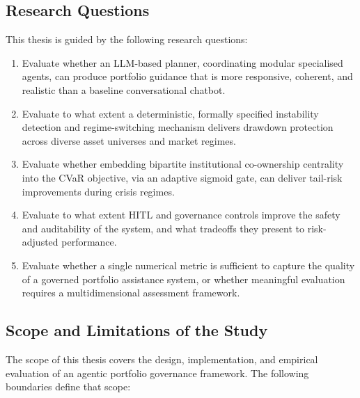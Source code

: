 \documentclass[11pt]{article}
\begin{document}
\subsection{Research Questions}
This thesis is guided by the following research questions:
\begin{enumerate}
  \item Evaluate whether an LLM-based planner, coordinating modular specialised agents, can produce portfolio guidance that is more responsive, coherent, and realistic than a baseline conversational chatbot.
  \item Evaluate to what extent a deterministic, formally specified instability detection and regime-switching mechanism delivers drawdown protection across diverse asset universes and market regimes.
  \item Evaluate whether embedding bipartite institutional co-ownership centrality into the CVaR objective, via an adaptive sigmoid gate, can deliver tail-risk improvements during crisis regimes.
  \item Evaluate to what extent HITL and governance controls improve the safety and auditability of the system, and what tradeoffs they present to risk-adjusted performance.
  \item Evaluate whether a single numerical metric is sufficient to capture the quality of a governed portfolio assistance system, or whether meaningful evaluation requires a multidimensional assessment framework.
\end{enumerate}

\subsection{Scope and Limitations of the Study}
The scope of this thesis covers the design, implementation, and empirical evaluation of an agentic portfolio governance framework. The following boundaries define that scope:
\end{document}
